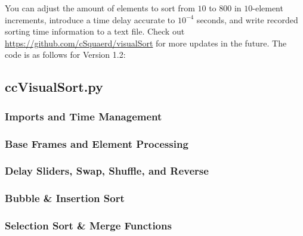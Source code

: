 \documentclass[12pt]{article}
\begin{document}
	You can adjust the amount of elements to sort from $10$ to $800$ in $10$-element increments, introduce a time delay accurate to $10^{-4}$ seconds, and write recorded sorting time information to a text file. Check out \url{https://github.com/cSquaerd/visualSort} for more updates in the future. The code is as follows for Version 1.2:

	\subsection{ccVisualSort.py}
	\scriptsize

	\subsubsection{Imports and Time Management}
	
	\pagebreak

	\subsubsection{Base Frames and Element Processing}
	
	\pagebreak

	\subsubsection{Delay Sliders, Swap, Shuffle, and Reverse}
	
	\pagebreak

	\subsubsection{Bubble \& Insertion Sort}
	
	\pagebreak

	\subsubsection{Selection Sort \& Merge Functions}
	
	\pagebreak
\end{document}
